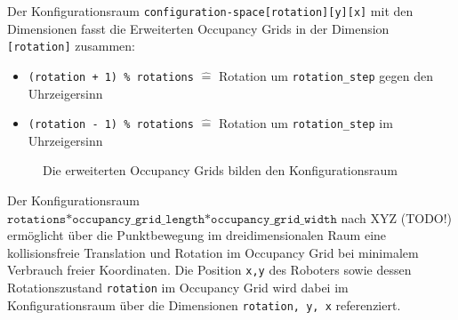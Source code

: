 Der Konfigurationsraum \texttt{configuration-space[rotation][y][x]} mit den Dimensionen fasst die Erweiterten Occupancy Grids in der Dimension \texttt{[rotation]} zusammen:
\begin{itemize}
\item \texttt{(rotation + 1) \% rotations} $\widehat{=}$ Rotation um \texttt{rotation\_step} gegen den Uhrzeigersinn
\item \texttt{(rotation - 1) \% rotations} $\widehat{=}$ Rotation um \texttt{rotation\_step} im Uhrzeigersinn
\end{itemize}
\vspace*{0.4cm}
\begin{figure}[H]
	\centering
	\footnotesize
	\centerline{}
	\caption{Die erweiterten Occupancy Grids bilden den Konfigurationsraum}
\end{figure}

Der Konfigurationsraum $\texttt{rotations*occupancy\_grid\_length*occupancy\_grid\_width}$ nach XYZ (TODO!) ermöglicht über die Punktbewegung im dreidimensionalen Raum eine kollisionsfreie Translation und Rotation im Occupancy Grid bei minimalem Verbrauch freier Koordinaten. 
Die Position \texttt{x,y} des Roboters sowie dessen Rotationszustand \texttt{rotation} im Occupancy Grid wird dabei im Konfigurationsraum über die Dimensionen \texttt{rotation, y, x} referenziert.



